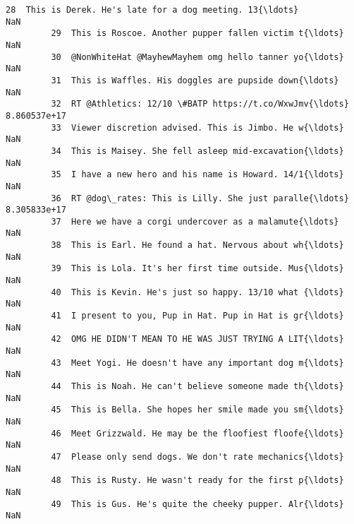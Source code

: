 \documentclass[11pt]{article}
\begin{document}
\begin{Verbatim}[commandchars=\\\{\}]
         28  This is Derek. He's late for a dog meeting. 13{\ldots}                  NaN   
         29  This is Roscoe. Another pupper fallen victim t{\ldots}                  NaN   
         30  @NonWhiteHat @MayhewMayhem omg hello tanner yo{\ldots}                  NaN   
         31  This is Waffles. His doggles are pupside down{\ldots}                  NaN   
         32  RT @Athletics: 12/10 \#BATP https://t.co/WxwJmv{\ldots}         8.860537e+17   
         33  Viewer discretion advised. This is Jimbo. He w{\ldots}                  NaN   
         34  This is Maisey. She fell asleep mid-excavation{\ldots}                  NaN   
         35  I have a new hero and his name is Howard. 14/1{\ldots}                  NaN   
         36  RT @dog\_rates: This is Lilly. She just paralle{\ldots}         8.305833e+17   
         37  Here we have a corgi undercover as a malamute{\ldots}                  NaN   
         38  This is Earl. He found a hat. Nervous about wh{\ldots}                  NaN   
         39  This is Lola. It's her first time outside. Mus{\ldots}                  NaN   
         40  This is Kevin. He's just so happy. 13/10 what {\ldots}                  NaN   
         41  I present to you, Pup in Hat. Pup in Hat is gr{\ldots}                  NaN   
         42  OMG HE DIDN'T MEAN TO HE WAS JUST TRYING A LIT{\ldots}                  NaN   
         43  Meet Yogi. He doesn't have any important dog m{\ldots}                  NaN   
         44  This is Noah. He can't believe someone made th{\ldots}                  NaN   
         45  This is Bella. She hopes her smile made you sm{\ldots}                  NaN   
         46  Meet Grizzwald. He may be the floofiest floofe{\ldots}                  NaN   
         47  Please only send dogs. We don't rate mechanics{\ldots}                  NaN   
         48  This is Rusty. He wasn't ready for the first p{\ldots}                  NaN   
         49  This is Gus. He's quite the cheeky pupper. Alr{\ldots}                  NaN   
         

\end{Verbatim}
\end{document}
